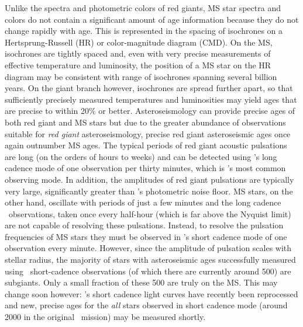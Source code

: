 Unlike the spectra and photometric colors of red giants, MS star spectra and
colors do not contain a significant amount of age information because they do
not change rapidly with age.
This is represented in the spacing of isochrones on a Hertsprung-Russell (HR)
or color-magnitude diagram (CMD).
On the MS, isochrones are tightly spaced and, even with very precise
measurements of effective temperature and luminosity, the position of a MS
star on the HR diagram may be consistent with range of isochrones spanning
several billion years.
On the giant branch however, isochrones are spread further apart, so that
sufficiently precisely measured temperatures and luminosities may yield ages
that are precise to within 20\% or better.
Asteroseismology can provide precise ages of both red giant and MS stars
but due to the greater abundance of observations suitable for {\it red
giant} asteroseismology, precise red giant asteroseismic ages once again
outnumber MS ages.
The typical periods of red giant acoustic pulsations are long (on the orders
of hours to weeks) and can be detected using \kepler's long cadence mode of
one observation per thirty minutes, which is \kepler's most common observing
mode.
In addition, the amplitudes of red giant pulsations are typically very large,
significantly greater than \kepler's photometric noise floor.
MS stars, on the other hand, oscillate with periods of just a few minutes and
the long cadence \kepler\ observations, taken once every half-hour (which is
far above the Nyquist limit) are not capable of resolving these pulsations.
Instead, to resolve the pulsation frequencies of MS stars they must be
observed in \kepler's short cadence mode of one observation every minute.
However, since the amplitude of pulsation scales with stellar radius, the
majority of stars with asteroseismic ages successfully measured using \kepler\
short-cadence observations (of which there are currently around 500) are
subgiants.
Only a small fraction of these 500 are truly on the MS.
 This may change soon however: \kepler's short cadence
light curves have recently been reprocessed and new, precise ages for the {\it
all} stars observed in short cadence mode (around 2000 in the original
\kepler\ mission) may be measured shortly.

